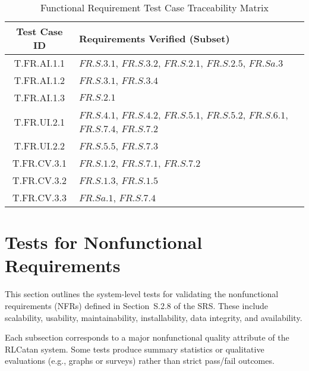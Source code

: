 \documentclass[12pt, titlepage]{article}
\begin{document}
\begin{table}[h!]
    \centering
    \caption{Functional Requirement Test Case Traceability Matrix}
    \label{tab:fr-system-test-traceability}
    \begin{tabularx}{\textwidth}{|c|X|}
    \hline
    \textbf{Test Case ID} & \textbf{Requirements Verified (Subset)} \\
    \hline
    T.FR.AI.1.1 & $\hyperref[FR.S.3.1]{FR.S.3.1}$, $\hyperref[FR.S.3.2]{FR.S.3.2}$, $\hyperref[FR.S.2.1]{FR.S.2.1}$, $\hyperref[FR.S.2.5]{FR.S.2.5}$, $\hyperref[FR.Sa.3]{FR.Sa.3}$ \\
    \hline
    T.FR.AI.1.2 & $\hyperref[FR.S.3.1]{FR.S.3.1}$, $\hyperref[FR.S.3.4]{FR.S.3.4}$ \\
    \hline
    T.FR.AI.1.3 & $\hyperref[FR.S.2.1]{FR.S.2.1}$ \\
    \hline
    T.FR.UI.2.1 & $\hyperref[FR.S.4.1]{FR.S.4.1}$, $\hyperref[FR.S.4.2]{FR.S.4.2}$, $\hyperref[FR.S.5.1]{FR.S.5.1}$, $\hyperref[FR.S.5.2]{FR.S.5.2}$, $\hyperref[FR.S.6.1]{FR.S.6.1}$, $\hyperref[FR.S.7.4]{FR.S.7.4}$, $\hyperref[FR.S.7.2]{FR.S.7.2}$ \\
    \hline
    T.FR.UI.2.2 & $\hyperref[FR.S.5.5]{FR.S.5.5}$, $\hyperref[FR.S.7.3]{FR.S.7.3}$ \\
    \hline
    T.FR.CV.3.1 & $\hyperref[FR.S.1.2]{FR.S.1.2}$, $\hyperref[FR.S.7.1]{FR.S.7.1}$, $\hyperref[FR.S.7.2]{FR.S.7.2}$ \\
    \hline
    T.FR.CV.3.2 & $\hyperref[FR.S.1.3]{FR.S.1.3}$, $\hyperref[FR.S.1.5]{FR.S.1.5}$ \\
    \hline
    T.FR.CV.3.3 & $\hyperref[FR.Sa.1]{FR.Sa.1}$, $\hyperref[FR.S.7.4]{FR.S.7.4}$ \\
    \hline
    \end{tabularx}
\end{table}

\section{Tests for Nonfunctional Requirements}

This section outlines the system-level tests for validating the nonfunctional requirements (NFRs) defined in Section~S.2.8 of the SRS. These include scalability, usability, maintainability, installability, data integrity, and availability. 

Each subsection corresponds to a major nonfunctional quality attribute of the RLCatan system. Some tests produce summary statistics or qualitative evaluations (e.g., graphs or surveys) rather than strict pass/fail outcomes.  
\end{document}
